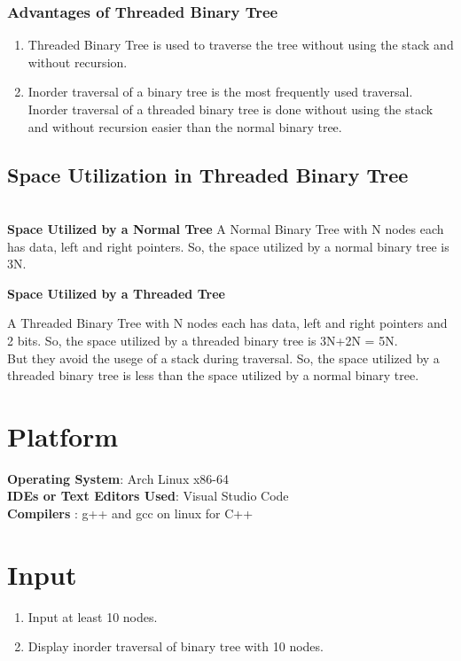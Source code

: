 \documentclass[11pt]{article}
\begin{document}
\subsubsection{Advantages of Threaded Binary Tree}

\begin{enumerate}
    \item Threaded Binary Tree is used to traverse the tree without using the stack and without recursion.
    \item Inorder traversal of a binary tree is the most frequently used traversal. Inorder traversal of a threaded binary tree is done without using the stack and without recursion easier than the normal binary tree.
\end{enumerate}


\subsection{Space Utilization in Threaded Binary Tree}\\

\textbf{Space Utilized by a Normal Tree}
A Normal Binary Tree with N nodes each has data, left and right pointers. So, the space utilized by a normal binary tree is 3N.\

\textbf{Space Utilized by a Threaded Tree}

A Threaded Binary Tree with N nodes each has data, left and right pointers and 2 bits. So, the space utilized by a threaded binary tree is 3N+2N = 5N.\\

But they avoid the usege of a stack during traversal. So, the space utilized by a threaded binary tree is less than the space utilized by a normal binary tree.

\section{Platform}
\textbf{\textbf{Operating System}}: Arch Linux x86-64 \\
\textbf{\textbf{IDEs or Text Editors Used}}: Visual Studio Code\\
\textbf{\textbf{Compilers} }: g++ and gcc on linux for C++\\

\section{Input}
\begin{enumerate}
    \item Input at least 10 nodes.
    \item Display inorder traversal of binary tree with 10 nodes.
\end{enumerate}
\end{document}

